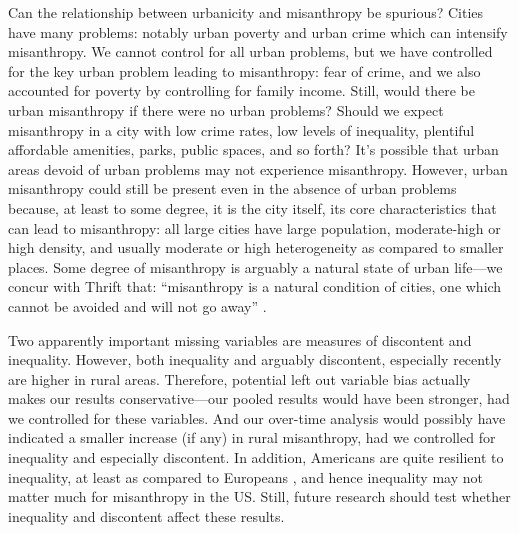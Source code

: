 \documentclass[11pt, letterpaper]{article}
\begin{document}
\begin{spacing}{1.4}
Can the relationship between urbanicity and misanthropy be spurious? Cities have many problems: notably urban poverty and urban crime which can intensify misanthropy. We cannot control for all urban problems, but we have
controlled for the key urban problem leading to misanthropy: fear of crime, and we also accounted for poverty by controlling for family income. 
Still, would there be urban misanthropy if there were no urban problems? Should we expect misanthropy in a city with low crime rates, low levels of inequality, plentiful affordable amenities, parks, public spaces, and so forth? It's possible that urban areas devoid of urban problems may not experience misanthropy. However, urban misanthropy could still be present even in the absence of urban problems because, at least to some degree, it is the city itself, its core characteristics that can lead to misanthropy: all large cities have large population, moderate-high or high density, and usually moderate or high heterogeneity as compared to smaller
places. Some degree of misanthropy is arguably a natural state of urban life---we concur with Thrift that: ``misanthropy is a natural condition of cities, one which cannot be avoided and will not go away'' \citep{thrift05}.
%

Two apparently important missing variables are measures of discontent and
inequality. However, both inequality \citep[e.g.,][]{daleyMISCNYT20apr14} %
and arguably discontent, especially recently 
\citep[e.g.,][]{case15,hansonCityJournalautumn15,fullerNYT17monD} 
%
 are higher in rural areas. Therefore, potential left out variable bias actually makes our results conservative---our pooled results would have been stronger, had we controlled for these variables. 
 And our over-time analysis would possibly have indicated a smaller increase (if any) in rural misanthropy, had we controlled for inequality and especially discontent.  
 In addition, Americans are quite resilient to inequality, at least as compared to Europeans \citep{alesina04al}, and hence inequality may not matter much for misanthropy in the US.
Still, future research should test whether inequality and discontent affect these results. 


\end{spacing}
\end{document}
